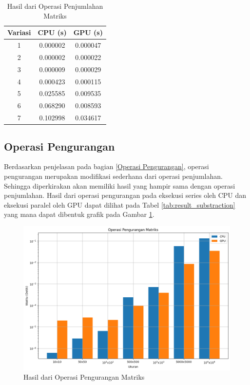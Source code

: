 \begin{table}[H]
	\centering
	\caption{Hasil dari Operasi Penjumlahan Matriks}
	\label{tab:result_addition}
	\begin{tabular}{ccc}
		\toprule
		Variasi & CPU (s)  & GPU (s)  \\
		\midrule
		1       & 0.000002 & 0.000047 \\
		2       & 0.000002 & 0.000022 \\
		3       & 0.000009 & 0.000029 \\
		4       & 0.000423 & 0.000115 \\
		5       & 0.025585 & 0.009535 \\
		6       & 0.068290 & 0.008593 \\
		7       & 0.102998 & 0.034617 \\
		\bottomrule
	\end{tabular}
\end{table}

\subsection{Operasi Pengurangan}

Berdasarkan penjelasan pada bagian \ref{Operasi Pengurangan}, operasi pengurangan merupakan modifikasi sederhana dari operasi penjumlahan. Sehingga diperkirakan akan memiliki hasil yang hampir sama dengan operasi penjumlahan. Hasil dari operasi pengurangan pada eksekusi series oleh CPU dan eksekusi paralel oleh GPU dapat dilihat pada Tabel \ref{tab:result_substraction} yang mana dapat dibentuk grafik pada Gambar \ref{img:result_substraction}.

\begin{figure}[H]
	\centering
	\includegraphics[width=14cm, scale=1]{images/penelitian/substraction.png}
	\caption{Hasil dari Operasi Pengurangan Matriks}
	\label{img:result_substraction}
\end{figure}

